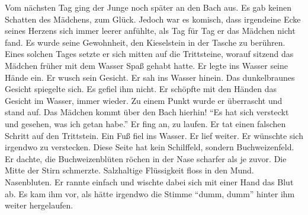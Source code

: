 \documentclass[prd,12pt,tightenlines,notitlepage,nofootinbib]{revtex4-1}
\begin{document}
Vom nächsten Tag ging der Junge noch später an den Bach aus.  Es gab
keinen Schatten des Mädchens, zum Glück.  Jedoch war es komisch, dass
irgendeine Ecke seines Herzens sich immer leerer anfühlte, als Tag für
Tag er das Mädchen nicht fand.  Es wurde seine Gewohnheit, den
Kieselstein in der Tasche zu berühren.  Eines solchen Tages setzte er
sich mitten auf die Trittsteine, worauf sitzend das Mädchen früher mit
dem Wasser Spaß gehabt hatte.  Er legte ins Wasser seine Hände ein.
Er wusch sein Gesicht.  Er sah ins Wasser hinein.  Das dunkelbraunes
Gesicht spiegelte sich.  Es gefiel ihm nicht.  Er schöpfte mit den
Händen das Gesicht im Wasser, immer wieder.  Zu einem Punkt wurde er
überrascht und stand auf.  Das Mädchen kommt über den Bach hierhin!
"`Es hat sich versteckt und gesehen, was ich getan habe."'
Er fing an,
zu laufen.  Er tat einen falschen Schritt auf den Trittstein.  Ein
Fuß fiel ins Wasser.  Er lief weiter.  Er wünschte sich irgendwo zu
verstecken.  Diese Seite hat kein Schilffeld, sondern Buchweizenfeld.
Er dachte, die Buchweizenblüten röchen in der Nase scharfer als je
zuvor.  Die Mitte der Stirn schmerzte.  Salzhaltige Flüssigkeit floss
in den Mund.  Nasenbluten.  Er rannte einfach und wischte dabei sich
mit einer Hand das Blut ab.  Es kam ihm vor, als hätte irgendwo die
Stimme "`dumm, dumm"' hinter ihm weiter hergelaufen.
\end{document}
